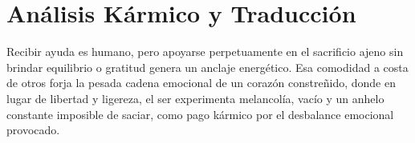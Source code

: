 \section{Análisis Kármico y Traducción}
\begin{figure}
  \vspace{-1.5em}
  \begin{center}
  \end{center}
  \vspace{-1.5em}
\end{figure}
Recibir ayuda es humano, pero apoyarse perpetuamente en el sacrificio ajeno sin brindar equilibrio o gratitud genera un anclaje energético. Esa comodidad a costa de otros forja la pesada cadena emocional de un corazón constreñido, donde en lugar de libertad y ligereza, el ser experimenta melancolía, vacío y un anhelo constante imposible de saciar, como pago kármico por el desbalance emocional provocado.

